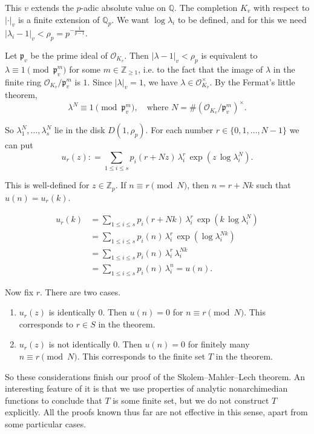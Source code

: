 \documentclass{article}
\newcommand{\dfn}{\mathrel{\mathop:}=}
\newcommand{\ZZ}{\mathbb{Z}}
\newcommand{\QQ}{\mathbb{Q}}
\renewcommand{\O}{\mathcal{O}}
\theoremstyle{myplain}
\theoremstyle{mydefinition}
\begin{document}
This $v$ extends the $p$-adic absolute value on $\QQ$. The completion $K_v$ with
respect to $|\cdot|_v$ is a finite extension of $\QQ_p$. We want
$\log \lambda_i$ to be defined, and for this we need
$|\lambda_i - 1|_v < \rho_p = p^{-\frac{1}{p-1}}$.

Let $\mathfrak{p}_v$ be the prime ideal of $\O_{K_v}$. Then
$|\lambda - 1|_v < \rho_p$ is equivalent to
$\lambda \equiv 1 \pmod{\mathfrak{p}_v^m}$ for some $m \in \ZZ_{\ge 1}$, i.e. to
the fact that the image of $\lambda$ in the finite ring
$\O_{K_v} / \mathfrak{p}_v^m$ is $1$. Since $|\lambda|_v = 1$, we have
$\lambda \in \O_{K_v}^\times$. By the Fermat's little theorem,
\[ \lambda^N \equiv 1 \pmod{\mathfrak{p}_v^m}, \quad
  \text{where } N = \# (\O_{K_v} / \mathfrak{p}_v^m)^\times. \]

So $\lambda_1^N, \ldots, \lambda_s^N$ lie in the disk $D (1, \rho_p)$. For each
number $r \in \{ 0, 1, \ldots, N-1 \}$ we can put
\[ u_r (z) \dfn \sum_{1 \le i \le s} p_i (r + Nz) \, \lambda_i^r \, \exp (z \, \log \lambda_i^N). \]

This is well-defined for $z \in \ZZ_p$. If $n \equiv r \pmod{N}$, then
$n = r + N k$ such that $u (n) = u_r (k)$.

\begin{align*}
  u_r (k) & = \sum_{1 \le i \le s} p_i (r + Nk) \, \lambda_i^r \, \exp (k \, \log \lambda_i^N) \\
          & = \sum_{1 \le i \le s} p_i (n) \, \lambda_i^r \, \exp (\log \lambda_i^{Nk})\\
          & = \sum_{1 \le i \le s} p_i (n) \, \lambda_i^r \, \lambda_i^{N k}\\
          & = \sum_{1 \le i \le s} p_i (n) \, \lambda_i^n = u (n).
\end{align*}

Now fix $r$. There are two cases.

\begin{enumerate}
\item $u_r (z)$ is identically $0$. Then $u (n) = 0$ for $n \equiv r \pmod
  {N}$. This corresponds to $r \in S$ in the theorem.

\item $u_r (z)$ is not identically $0$. Then $u (n) = 0$ for finitely many
  $n \equiv r \pmod{N}$. This corresponds to the finite set $T$ in the theorem.
\end{enumerate}

So these considerations finish our proof of the Skolem--Mahler--Lech theorem. An
interesting feature of it is that we use properties of analytic nonarchimedian
functions to conclude that $T$ is some finite set, but we do not construct $T$
explicitly. All the proofs known thus far are not effective in this sense, apart
from some particular cases.
\end{document}
